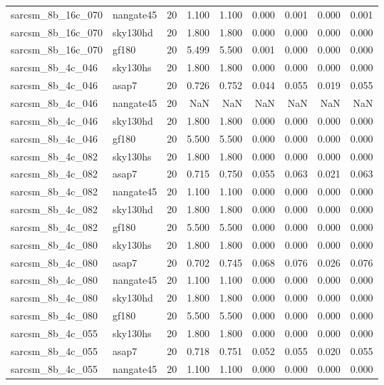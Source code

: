 \begin{tabular}{llrrrrrrr}
sarcsm\_8b\_16c\_070 & nangate45 & 20 & 1.100 & 1.100 & 0.000 & 0.001 & 0.000 & 0.001 \\
sarcsm\_8b\_16c\_070 & sky130hd & 20 & 1.800 & 1.800 & 0.000 & 0.000 & 0.000 & 0.000 \\
sarcsm\_8b\_16c\_070 & gf180 & 20 & 5.499 & 5.500 & 0.001 & 0.000 & 0.000 & 0.000 \\
sarcsm\_8b\_4c\_046 & sky130hs & 20 & 1.800 & 1.800 & 0.000 & 0.000 & 0.000 & 0.000 \\
sarcsm\_8b\_4c\_046 & asap7 & 20 & 0.726 & 0.752 & 0.044 & 0.055 & 0.019 & 0.055 \\
sarcsm\_8b\_4c\_046 & nangate45 & 20 & NaN & NaN & NaN & NaN & NaN & NaN \\
sarcsm\_8b\_4c\_046 & sky130hd & 20 & 1.800 & 1.800 & 0.000 & 0.000 & 0.000 & 0.000 \\
sarcsm\_8b\_4c\_046 & gf180 & 20 & 5.500 & 5.500 & 0.000 & 0.000 & 0.000 & 0.000 \\
sarcsm\_8b\_4c\_082 & sky130hs & 20 & 1.800 & 1.800 & 0.000 & 0.000 & 0.000 & 0.000 \\
sarcsm\_8b\_4c\_082 & asap7 & 20 & 0.715 & 0.750 & 0.055 & 0.063 & 0.021 & 0.063 \\
sarcsm\_8b\_4c\_082 & nangate45 & 20 & 1.100 & 1.100 & 0.000 & 0.000 & 0.000 & 0.000 \\
sarcsm\_8b\_4c\_082 & sky130hd & 20 & 1.800 & 1.800 & 0.000 & 0.000 & 0.000 & 0.000 \\
sarcsm\_8b\_4c\_082 & gf180 & 20 & 5.500 & 5.500 & 0.000 & 0.000 & 0.000 & 0.000 \\
sarcsm\_8b\_4c\_080 & sky130hs & 20 & 1.800 & 1.800 & 0.000 & 0.000 & 0.000 & 0.000 \\
sarcsm\_8b\_4c\_080 & asap7 & 20 & 0.702 & 0.745 & 0.068 & 0.076 & 0.026 & 0.076 \\
sarcsm\_8b\_4c\_080 & nangate45 & 20 & 1.100 & 1.100 & 0.000 & 0.000 & 0.000 & 0.000 \\
sarcsm\_8b\_4c\_080 & sky130hd & 20 & 1.800 & 1.800 & 0.000 & 0.000 & 0.000 & 0.000 \\
sarcsm\_8b\_4c\_080 & gf180 & 20 & 5.500 & 5.500 & 0.000 & 0.000 & 0.000 & 0.000 \\
sarcsm\_8b\_4c\_055 & sky130hs & 20 & 1.800 & 1.800 & 0.000 & 0.000 & 0.000 & 0.000 \\
sarcsm\_8b\_4c\_055 & asap7 & 20 & 0.718 & 0.751 & 0.052 & 0.055 & 0.020 & 0.055 \\
sarcsm\_8b\_4c\_055 & nangate45 & 20 & 1.100 & 1.100 & 0.000 & 0.000 & 0.000 & 0.000 \\

\end{tabular}
